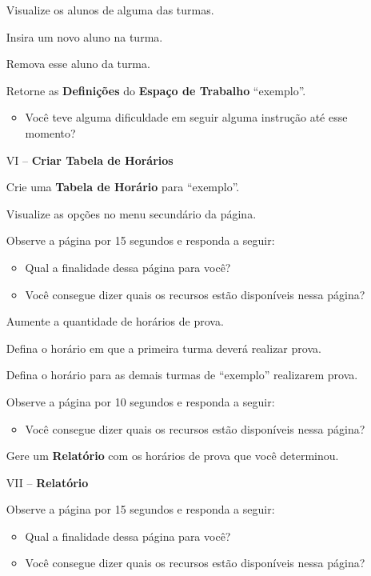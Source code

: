 \begin{apendicesenv}
\begin{enumerate}
Visualize os alunos de alguma das turmas.

Insira um novo aluno na turma.

Remova esse aluno da turma.

Retorne as \textbf{Definições} do \textbf{Espaço de Trabalho} “exemplo”.

\begin{itemize}
    \item Você teve alguma dificuldade em seguir alguma instrução até esse momento?
\end{itemize}
    
    \item[VI --] \textbf{Criar Tabela de Horários}

Crie uma \textbf{Tabela de Horário} para “exemplo”.

Visualize as opções no menu secundário da página.

Observe a página por 15 segundos e responda a seguir:

\begin{itemize}
    \item Qual a finalidade dessa página para você? 
    \item Você consegue dizer quais os recursos estão disponíveis nessa página?
\end{itemize}

Aumente a quantidade de horários de prova.

Defina o horário em que a primeira turma deverá realizar prova.

Defina o horário para as demais turmas de “exemplo” realizarem prova.

Observe a página por 10 segundos e responda a seguir:

\begin{itemize}
    \item Você consegue dizer quais os recursos estão disponíveis nessa página?
\end{itemize}

Gere um \textbf{Relatório} com os horários de prova que você determinou.

    \item[VII --] \textbf{Relatório}

Observe a página por 15 segundos e responda a seguir:

\begin{itemize}
    \item Qual a finalidade dessa página para você? 
    \item Você consegue dizer quais os recursos estão disponíveis nessa página?
\end{itemize}


\end{enumerate}
\end{apendicesenv}
